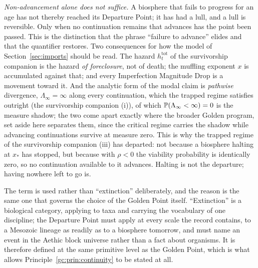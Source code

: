 \begin{definition}
\emph{Non-advancement alone does not suffice.} A biosphere that fails
to progress for an age has not thereby reached its Departure Point; it
has had a lull, and a lull is reversible. Only when no continuation
remains that advances has the point been passed. This is the
distinction that the phrase ``failure to advance'' elides and that the
quantifier restores. Two consequences for how the model of Section~\ref{sec:imports} should be read.
The hazard $h^{\mathrm{tot}}_t$ of the survivorship companion \cite{GoldenSurvivorship} is the hazard
\emph{of foreclosure}, not of death; the muffling exponent $x$ is
accumulated against that; and every Imperfection Magnitude Drop is a
movement toward it. And the analytic form of the modal claim is \emph{pathwise}
divergence, $\Lambda_\infty=\infty$ along every continuation, which
the trapped regime satisfies outright
(the survivorship companion \cite{GoldenSurvivorship}(i)), of which
$\mathbb{P}(\Lambda_\infty<\infty)=0$ is the measure shadow; the two come
apart exactly where the broader Golden program, set aside here separates
them, since the critical regime carries the shadow while advancing
continuations survive at measure zero. This is why the
trapped regime of the survivorship companion \cite{GoldenSurvivorship}(iii) has
departed: not because a biosphere halting at $x_\ast$ has stopped, but
because with $\rho<0$ the viability probability is identically zero, so
no continuation available to it advances. Halting is not the departure;
having nowhere left to go is.

The term is used rather than ``extinction'' deliberately, and the
reason is the same one that governs the choice of the Golden Point
itself. ``Extinction'' is a biological category, applying to taxa and
carrying the vocabulary of one discipline; the Departure Point must
apply at every scale the record contains, to a Mesozoic lineage as
readily as to a biosphere tomorrow, and must name an event in the
Aethic block universe rather than a fact about organisms. It is
therefore defined at the same primitive level as the Golden Point,
which is what allows Principle~\ref{gc:prin:continuity} to be stated at
all.


\end{definition}
